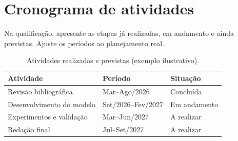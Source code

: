 \chapter{Cronograma de atividades}
Na qualificação, apresente as etapas já realizadas, em andamento e ainda previstas. Ajuste os períodos ao planejamento real.
\begin{table}[htbp]\centering\caption{Atividades realizadas e previstas (exemplo ilustrativo).}\begin{tabular}{p{6cm}p{3.5cm}p{3cm}}\toprule Atividade & Período & Situação\\\midrule Revisão bibliográfica & Mar--Ago/2026 & Concluída\\ Desenvolvimento do modelo & Set/2026--Fev/2027 & Em andamento\\ Experimentos e validação & Mar--Jun/2027 & A realizar\\ Redação final & Jul--Set/2027 & A realizar\\\bottomrule\end{tabular}\end{table}
